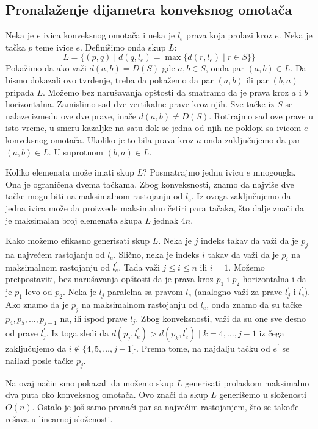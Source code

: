 \documentclass[a4paper]{article}
\begin{document}
\subsection{Pronalaženje dijametra konveksnog omotača}
Neka je \(e\) ivica konveksnog omotača i neka je \(l_{e}\) prava koja prolazi kroz \(e\). Neka je
tačka \(p\) teme ivice \(e\). Definišimo onda skup \(L\):
\[
    L = \{ (p, q) \mid d(q, l_{e}) = \max\{d(r, l_{e}) \mid r \in S\} \}
\]
Pokažimo da ako važi \(d(a, b) = D(S)\) gde \(a, b \in S\), onda par \((a, b) \in L\).
Da bismo dokazali ovo tvrđenje, treba da pokažemo da par \((a, b)\) ili par \((b, a)\) pripada \(L\).
Možemo bez narušavanja opštosti da smatramo da je prava kroz \(a\) i \(b\) horizontalna. Zamislimo
sad dve vertikalne prave kroz njih. Sve tačke iz \(S\) se nalaze između ove dve prave, inače 
\(d(a, b) \ne D(S)\).  Rotirajmo sad ove prave u isto vreme, u smeru kazaljke na satu dok se jedna
od njih ne poklopi sa ivicom \(e\) konveksnog omotača. Ukoliko je to bila prava kroz \(a\) onda
zaključujemo da par \((a, b) \in L\). U suprotnom \((b, a) \in L\).

Koliko elemenata može imati skup \(L\)? Posmatrajmo jednu ivicu \(e\) mnogougla. Ona je ograničena dvema
tačkama. Zbog konveksnosti, znamo da najviše dve tačke mogu biti na maksimalnom rastojanju od \(l_{e}\).
Iz ovoga zaključujemo da jedna ivica može da proizvede maksimalno četiri para tačaka, što dalje znači
da je maksimalan broj elemenata skupa \(L\) jednak \(4n\).

Kako možemo efikasno generisati skup \(L\). Neka je \(j\) indeks takav da važi da je \(p_{j}\) na najvećem
rastojanju od \(l_{e}\). Slično, neka je indeks \(i\) takav da važi da je \(p_{i}\) na maksimalnom
rastojanju od \(l_{e}^{\prime}\). Tada važi \(j \leq i \leq n\) ili \(i = 1\). Možemo pretpostaviti,
bez narušavanja opštosti da je prava kroz \(p_{1}\) i \(p_{2}\) horizontalna i da je \(p_{1}\) levo od
\(p_{2}\).  Neka je \(l_{j}\) paralelna sa pravom \(l_{e}\) (analogno važi za prave \(l_{j}^{\prime}\) i
\(l_{e}^{\prime}\)). Ako znamo da je \(p_{j}\) na maksimalnom rastojanju od \(l_{e}\), onda znamo da su
tačke \(p_{4}, p_{5},\ldots,p_{j-1}\) na, ili ispod prave \(l_{j}\). Zbog konveksnosti, važi da su one
sve desno od prave \(l_{j}^{\prime}\). Iz toga sledi da \(d(p_{j}, l_{e}^{\prime}) > d(p_{k},
l_{e}^{\prime}) \mid k = 4,\ldots,j-1\) iz čega zaključujemo da \(i \notin \{4,5,\ldots,j-1\}\). Prema
tome, na najdalju tačku od \(e^{\prime}\) se nailazi posle tačke \(p_{j}\).

Na ovaj način smo pokazali da možemo skup \(L\) generisati prolaskom maksimalno dva puta oko konveksnog
omotača. Ovo znači da skup \(L\) generišemo u složenosti \(O(n)\). Ostalo je još samo pronaći par sa
najvećim rastojanjem, što se takođe rešava u linearnoj složenosti.
\end{document}
